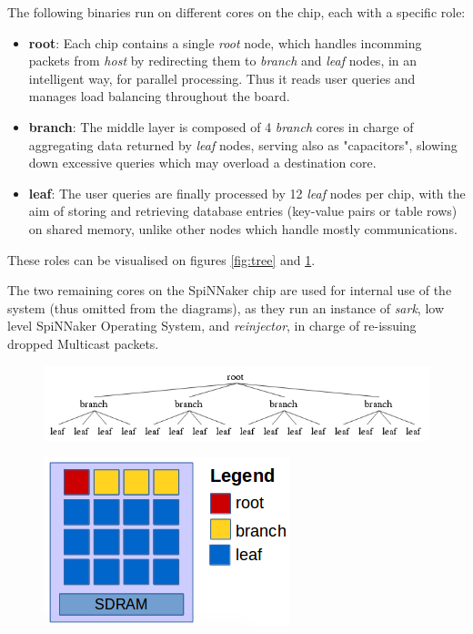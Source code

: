 The following binaries run on different cores on the chip, each with a specific role:
\begin{itemize}
	\item \textbf{root}: Each chip contains a single \textit{root} node, which handles incomming packets from \textit{host} by redirecting them to \textit{branch} and \textit{leaf} nodes, in an intelligent way, for parallel processing. Thus it reads user queries and manages load balancing throughout the board.
	\item \textbf{branch}: The middle layer is composed of 4 \textit{branch} cores in charge of aggregating data returned by \textit{leaf} nodes, serving also as "capacitors", slowing down excessive queries which may overload a destination core.
	\item \textbf{leaf}: The user queries are finally processed by 12 \textit{leaf} nodes per chip, with the aim of storing and retrieving database entries (key-value pairs or table rows) on shared memory, unlike other nodes which handle mostly communications.
\end{itemize}
	These roles can be visualised on figures \ref{fig:tree} and \ref{fig:tree-chip}.
	
	The two remaining cores on the SpiNNaker chip are used for internal use of the system (thus omitted from the diagrams), as they run an instance of \textit{sark}, low level SpiNNaker Operating System, and \textit{reinjector}, in charge of re-issuing dropped Multicast packets.
 
\begin{figure}
\centering
\begin{minipage}{1\textwidth}
  \centering
  \includegraphics[width=0.9\linewidth, natwidth=618, natheight=120]{images/tree.png}
  \label{fig:tree}
\end{minipage}
\begin{minipage}{1\textwidth}
  \centering
  \includegraphics[width=0.5\linewidth, natwidth=270, natheight=186]{images/tree-chip.png}
  \label{fig:tree-chip}
\end{minipage}
\end{figure}

